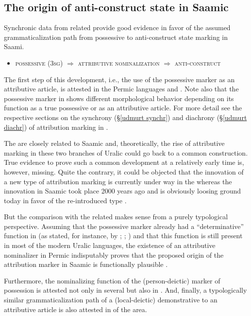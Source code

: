 {\subsection{The origin of anti\hyp{}construct state in Saamic}
Synchronic data from related  provide good evidence in favor of the assumed grammaticalization path from possessive to anti\hyp{}construct state marking in Saami.
\begin{itemize}
\item \textsc{possessive} (\textsc{3sg}) $\Rightarrow$ \textsc{attributive nominalization} $\Rightarrow$ \textsc{anti}-\textsc{construct}
\end{itemize}
The first step of this development, i.e., the use of the possessive marker as an attributive article, is attested in the Permic languages  and . Note also that the possessive marker in  shows different morphological behavior depending on its function as a true possessive or as an attributive article. For more detail see the respective sections on the synchrony (\S\ref{udmurt synchr}) and diachrony (\S\ref{udmurt diachr}) of attribution marking in .

The  are closely related to Saamic and, theoretically, the rise of attributive marking in these two branches of Uralic could go back to a common  construction. True evidence to prove such a common development at a relatively early time is, however, missing. Quite the contrary, it could be objected that the innovation of a new type of attribution marking is currently under way in the  whereas the innovation in Saamic took place 2000 years ago and is obviously loosing ground today in favor of the re-introduced type .

But the comparison with the related  makes sense from a purely typological perspective. Assuming that the possessive marker already had a “determinative” function in  (as stated, for instance, by \citealt[32]{janhunen1981}; \citealt[66, 81]{decsy1990}; \citealt{kunnap2004}) and that this function is still present in most of the modern Uralic languages, the existence of an attributive nominalizer in Permic indisputably proves that the proposed origin of the attribution marker in Saamic is functionally plausible \citep{riesler2006b}.

Furthermore, the nominalizing function of the (person-deictic) marker of possession is attested not only in several  but also in . And, finally, a typologically similar grammaticalization path of a (local-deictic) demonstrative to an attributive article is also attested in  of the area.

}
